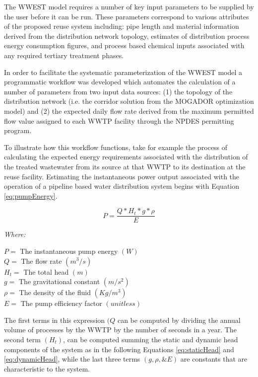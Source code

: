 The WWEST model requires a number of key input parameters to be supplied by the user before it can be run. These parameters correspond to various attributes of the proposed reuse system including: pipe length and material information derived from the distribution network topology, estimates of distribution process energy consumption figures, and process based chemical inputs associated with any required tertiary treatment phases.

In order to facilitate the systematic parameterization of the WWEST model a programmatic workflow was developed which automates the calculation of a number of parameters from two input data sources: (1) the topology of the distribution network (i.e. the corridor solution from the MOGADOR optimization model) and (2) the expected daily flow rate derived from the maximum permitted flow value assigned to each WWTP facility through the NPDES permitting program. 

To illustrate how this workflow functions, take for example the process of calculating the expected energy requirements associated with the distribution of the treated wastewater from its source at that WWTP to its destination at the reuse facility. Estimating the instantaneous power output associated with the operation of a pipeline based water distribution system begins with Equation \ref{eq:pumpEnergy}.

      \begin{equation}
          P = \frac{Q * H_t * g * \rho}{E}
          \label{eq:pumpEnergy}
      \end{equation}
      
       \noindent \textit{Where:} \hfill

       \begin{center}
           $P = $ The instantaneous pump energy $(W)$ \\
           $Q = $ The flow rate $(m^{3}/s)$\\
           $H_{t} = $ The total head $(m)$ \\
           $g = $ The gravitational constant $(m/s^{2})$ \\
           $\rho = $ The density of the fluid $(Kg/m^3)$ \\
           $E = $ The pump efficiency factor $(unitless)$ \\
       \end{center}

The first terms in this expression $(Q$ can be computed by dividing the annual volume of processes by the WWTP by the number of seconds in a year. The second term $(H_t)$, can be computed summing the static and dynamic head components of the system as in the following Equations \ref{eq:staticHead} and \ref{eq:dynamicHead}, while the last three terms $(g,\rho, \& E)$ are constants that are characteristic to the system.

